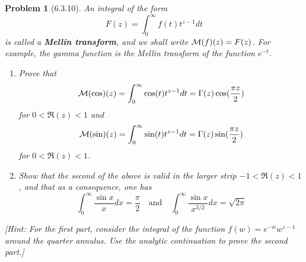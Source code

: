 \documentclass[10pt]{article}
\theoremstyle{plain}
\newtheorem{problem}{Problem}
\theoremstyle{remark}
\begin{document}
\begin{problem}[6.3.10]
  An integral of the form
  \[
    F(z)=\int_0^\infty f(t)t^{z-1}dt
  \]
  is called a \textbf{Mellin transform}, and we shall write
  ${\cal M}(f)(z)=F(z)$. For example, the gamma function is the Mellin
  transform of the function $e^{-t}$.
  \begin{enumerate}
  \item[(a)] Prove that
    \[
      {\cal M}(\cos)(z)=\int_0^\infty\cos(t)t^{z-1}dt=\Gamma(z)\cos(\frac{\pi z}{2})
    \]
    for $0<\Re(z)<1$ and
    \[
      {\cal M}(\sin)(z)=\int_0^\infty\sin(t)t^{z-1}dt=\Gamma(z)\sin(\frac{\pi z}{2})
    \]
    for $0<\Re(z)<1$.
  \item[(b)] Show that the second of the above is valid in the larger strip
    $-1<\Re(z)<1$, and that as a consequence, one has
    \[
      \int_0^\infty \frac{\sin x}{x}dx=\frac{\pi}{2}\quad \text{and}\quad \int_0^\infty\frac{\sin x}{x^{3/2}}dx=\sqrt{2\pi}
    \]
  \end{enumerate}
  [Hint: For the first part, consider the integral of the function
  $f(w)=e^{-w}w^{z-1}$ around the quarter annulus. Use the analytic continuation
  to prove the second part.]
\end{problem}
\end{document}
